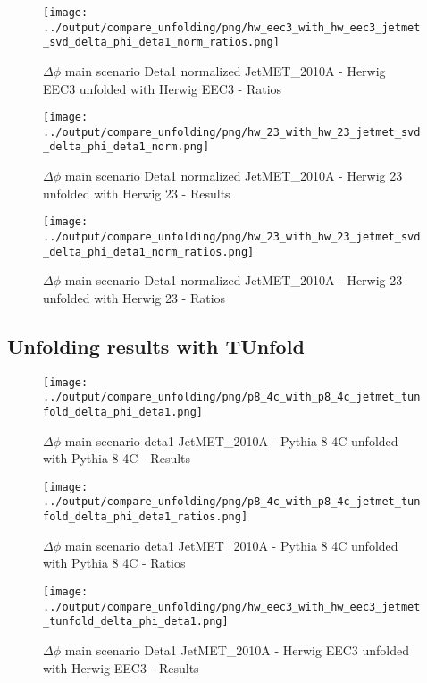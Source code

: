 \documentclass[11pt]{book}
\begin{document}
\begin{figure}[ht]
\centering
\texttt{[image: ../output/compare\_unfolding/png/hw\_eec3\_with\_hw\_eec3\_jetmet\_svd\_delta\_phi\_deta1\_norm\_ratios.png]}
\caption{$\Delta\phi$ main scenario Deta1 normalized JetMET\_2010A - Herwig EEC3 unfolded with Herwig EEC3 - Ratios}
\label{hw_eec3_hw_eec3_jetmet_svd_delta_phi_deta1_norm_b}
\end{figure}

\begin{figure}[ht]
\centering
\texttt{[image: ../output/compare\_unfolding/png/hw\_23\_with\_hw\_23\_jetmet\_svd\_delta\_phi\_deta1\_norm.png]}
\caption{$\Delta\phi$ main scenario Deta1 normalized JetMET\_2010A - Herwig 23 unfolded with Herwig 23 - Results}
\label{hw_23_hw_23_jetmet_svd_delta_phi_deta1_norm_a}
\end{figure}

\begin{figure}[ht]
\centering
\texttt{[image: ../output/compare\_unfolding/png/hw\_23\_with\_hw\_23\_jetmet\_svd\_delta\_phi\_deta1\_norm\_ratios.png]}
\caption{$\Delta\phi$ main scenario Deta1 normalized JetMET\_2010A - Herwig 23 unfolded with Herwig 23 - Ratios}
\label{hw_23_hw_23_jetmet_svd_delta_phi_deta1_norm_b}
\end{figure}




\clearpage
\subsection{Unfolding results with TUnfold}

\begin{figure}[ht]
\centering
\texttt{[image: ../output/compare\_unfolding/png/p8\_4c\_with\_p8\_4c\_jetmet\_tunfold\_delta\_phi\_deta1.png]}
\caption{$\Delta\phi$ main scenario deta1 JetMET\_2010A - Pythia 8 4C unfolded with Pythia 8 4C - Results}
\label{p8_p8_jetmet_tunfold_delta_phi_deta1_a}
\end{figure}

\begin{figure}[ht]
\centering
\texttt{[image: ../output/compare\_unfolding/png/p8\_4c\_with\_p8\_4c\_jetmet\_tunfold\_delta\_phi\_deta1\_ratios.png]}
\caption{$\Delta\phi$ main scenario deta1 JetMET\_2010A - Pythia 8 4C unfolded with Pythia 8 4C - Ratios}
\label{p8_p8_jetmet_tunfold_delta_phi_deta1_b}
\end{figure}

\begin{figure}[ht]
\centering
\texttt{[image: ../output/compare\_unfolding/png/hw\_eec3\_with\_hw\_eec3\_jetmet\_tunfold\_delta\_phi\_deta1.png]}
\caption{$\Delta\phi$ main scenario Deta1 JetMET\_2010A - Herwig EEC3 unfolded with Herwig EEC3 - Results}
\label{hw_eec3_hw_eec3_jetmet_tunfold_delta_phi_deta1_a}
\end{figure}
\end{document}
